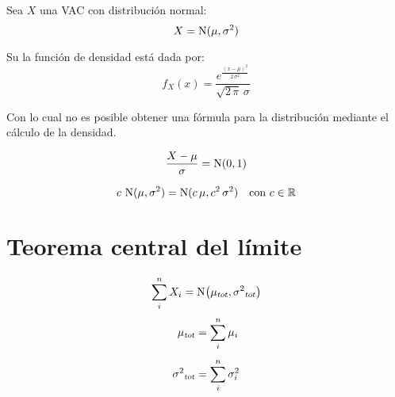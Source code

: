 Sea $X$ una VAC con distribución normal:
\begin{equation}
    X = \nor(\mu,\sigma^2)
\end{equation}

Su la función de densidad está dada por:
\begin{equation*}
    f_X(x) = \frac{e^{\tfrac{(x-\mu)^2}{2 \, \sigma^2}}}{\sqrt{2 \, \pi} \, \sigma}
\end{equation*}

Con lo cual no es posible obtener una fórmula para la distribución mediante el cálculo de la densidad.

\begin{mdframed}[style=PropertyFrame]
    \begin{prop}
    \end{prop}
    \begin{equation*}
        \frac{X-\mu}{\sigma} = \nor(0,1)
    \end{equation*}
\end{mdframed}

\begin{mdframed}[style=PropertyFrame]
    \begin{prop}
    \end{prop}
    \begin{equation*}
        c \, \nor(\mu,\sigma^2) = \nor(c \, \mu, c^2 \, \sigma^2) \quad \text{con } c \in \setR
    \end{equation*}
\end{mdframed}


\section{Teorema central del límite}

\begin{mdframed}[style=PropertyFrame]
    \begin{prop}
        \label{prop:TCL}
    \end{prop}
    \begin{equation*}
        \sum_i^n X_i = \fx[\nor]{\sub{\mu}{tot},\sub{\sigma^2}{tot}}
    \end{equation*}
    \begin{align*}
        \sub{\mu}{tot} &= \sum_i^n \mu_i
        \\[1ex]
        \sub{\sigma^2}{tot} &= \sum_i^n \sigma_i^2
    \end{align*}
\end{mdframed}


